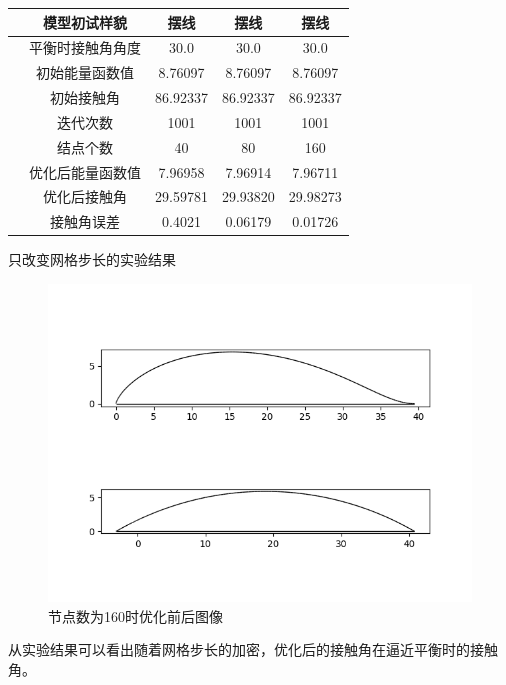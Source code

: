 \documentclass[12pt,oneside,a4paper]{article}
\begin{document}
\begin{center}
\renewcommand\arraystretch{2.2}
\begin{tabular}{|c|c|c|c|}
\hline 
\rule[-1ex]{0pt}{2.5ex}　模型初试样貌 & 摆线 & 摆线 & 摆线 \\ 
\hline 
\rule[-1ex]{0pt}{2.5ex}　平衡时接触角角度 & 30.0 & 30.0 & 30.0 \\ 
\hline 
\rule[-1ex]{0pt}{2.5ex}　初始能量函数值 & 8.76097 & 8.76097 & 8.76097 \\ 
\hline 
\rule[-1ex]{0pt}{2.5ex}　初始接触角 & 86.92337 & 86.92337 & 86.92337 \\ 
\hline 
\rule[-1ex]{0pt}{2.5ex}　迭代次数 & 1001 & 1001 & 1001 \\ 
\hline
\rule[-1ex]{0pt}{2.5ex}　结点个数 & 40 & 80 & 160 \\ 
\hline  
\rule[-1ex]{0pt}{2.5ex}　优化后能量函数值 & 7.96958 & 7.96914 & 7.96711 \\ 
\hline 
\rule[-1ex]{0pt}{2.5ex}　优化后接触角 & 29.59781 & 29.93820 & 29.98273 \\ 
\hline 
\rule[-1ex]{0pt}{2.5ex}　接触角误差 & 0.4021 & 0.06179 & 0.01726 \\ 
\hline 
\end{tabular} 
\centerline{只改变网格步长的实验结果}
\end{center}
\begin{figure}[H]
	\centering
	\includegraphics[width=0.7\linewidth]{figure/step-size-p.png}
	\caption{节点数为160时优化前后图像}
	\label{fig:1}
\end{figure}
从实验结果可以看出随着网格步长的加密，优化后的接触角在逼近平衡时的接触角。
\end{document}
